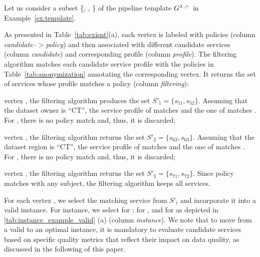 
\begin{example}[\bf \pipelineInstance]\label{ex:instance}

  Let us consider a subset \{, , \} of the pipeline template $G^{\lambda\,,\gamma\,}$ in Example~\ref{ex:template}.

  As presented in Table~\ref{tab:exisnt}(a), each vertex is labeled with policies (column \emph{candidate--$>$policy}) and then associated with different candidate services (column \emph{candidate}) and corresponding profile (column \emph{profile}). The filtering algorithm matches each candidate service profile with the policies in Table~\ref{tab:anonymization} annotating the corresponding vertex. It returns the set of services whose profile matches a policy (column \emph{filtering}):
  \begin{enumerate*}[label=\textit{\roman*})]
    \item vertex , the filtering algorithm produces the set $S'_1=\{s_{51},s_{52}\}$. Assuming that the dataset owner is ``CT'', the service profile of  matches  and the one of  matches . For , there is no policy match and, thus, it is discarded;
    \item vertex , the filtering algorithm returns the set $S'_2=\{s_{62},s_{63}\}$. Assuming that the dataset region is ``CT'', the service profile of  matches  and the one of  matches . For , there is no policy match and, thus, it is discarded;
    \item vertex , the filtering algorithm returns the set $S'_3=\{s_{71},s_{72}\}$. Since policy  matches with any subject, the filtering algorithm keeps all services.
  \end{enumerate*}

  For each vertex , we select the matching service  from $S'_i$ and incorporate it into a valid instance. For instance, we select  for ;  for , and  for 
  as depicted in \cref{tab:instance_example_valid} (a) (column \emph{instance}). We note that to move from a valid to an optimal instance, it is mandatory to evaluate candidate services based on specific quality metrics that reflect their impact on data quality, as discussed in the following of this paper.


\end{example}
